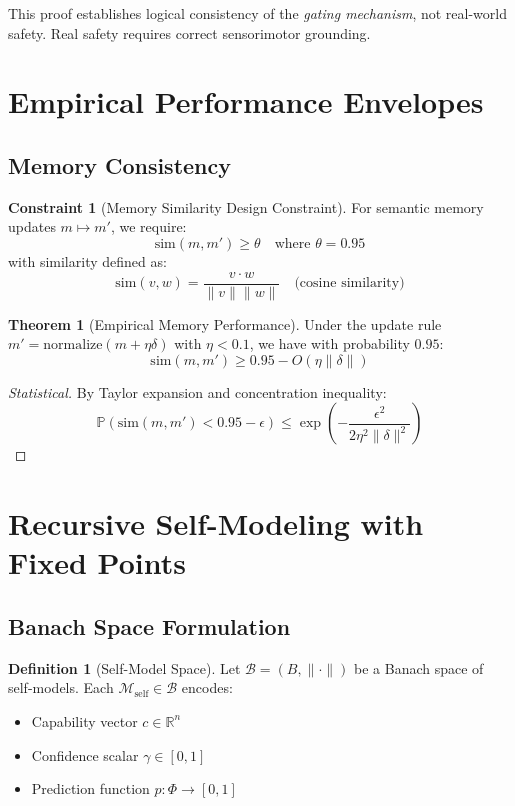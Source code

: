 \documentclass[12pt]{article}
\theoremstyle{definition}
\newtheorem{definition}{Definition}[section]
\newtheorem{theorem}{Theorem}[section]
\newtheorem{constraint}{Constraint}[section]
\newcommand{\self}{\mathcal{M}_{\text{self}}}
\begin{document}
\begin{remark}
This proof establishes logical consistency of the \emph{gating mechanism}, not real-world safety. Real safety requires correct sensorimotor grounding.
\end{remark}

\section{Empirical Performance Envelopes}

\subsection{Memory Consistency}

\begin{constraint}[Memory Similarity Design Constraint]
For semantic memory updates $m \mapsto m'$, we require:
\[
\text{sim}(m, m') \geq \theta \quad \text{where } \theta = 0.95
\]
with similarity defined as:
\[
\text{sim}(v, w) = \frac{v \cdot w}{\|v\|\|w\|} \quad \text{(cosine similarity)}
\]
\end{constraint}

\begin{theorem}[Empirical Memory Performance]
Under the update rule $m' = \text{normalize}(m + \eta \delta)$ with $\eta < 0.1$, we have with probability $0.95$:
\[
\text{sim}(m, m') \geq 0.95 - O(\eta\|\delta\|)
\]
\end{theorem}

\begin{proof}[Statistical]
By Taylor expansion and concentration inequality:
\[
\mathbb{P}\left(\text{sim}(m, m') < 0.95 - \epsilon\right) \leq \exp\left(-\frac{\epsilon^2}{2\eta^2\|\delta\|^2}\right)
\]
\end{proof}

\section{Recursive Self-Modeling with Fixed Points}

\subsection{Banach Space Formulation}

\begin{definition}[Self-Model Space]
Let $\mathcal{B} = (B, \|\cdot\|)$ be a Banach space of self-models. Each $\self \in \mathcal{B}$ encodes:
\begin{itemize}
    \item Capability vector $c \in \mathbb{R}^n$
    \item Confidence scalar $\gamma \in [0,1]$
    \item Prediction function $p: \Phi \to [0,1]$
\end{itemize}
\end{definition}
\end{document}
